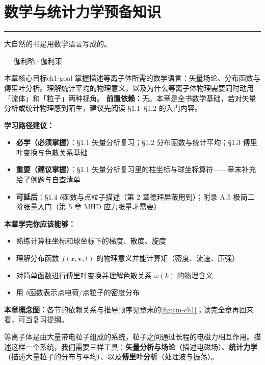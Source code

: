 \documentclass[12pt,a4paper,openany,oneside]{book}
\let\plainepigraph\epigraph
\renewcommand{\epigraph}[2]{%
  \par\addvspace{1.5pt}\noindent\hfill{\color{figAmber!75}\rule{2.8cm}{0.6pt}}\par
  \vspace{0.6pt}\plainepigraph{#1}{#2}}
\newcommand{\vect}[1]{\bm{#1}}
\begin{document}
\newpage


\chapter{数学与统计力学预备知识}\label{ch:1}
\epigraph{大自然的书是用数学语言写成的。}{--- 伽利略·伽利莱}

\begin{insight}{本章核心目标}{ch1-goal}
掌握描述等离子体所需的数学语言：矢量场论、分布函数与傅里叶分析。理解统计平均的物理意义，以及为什么等离子体物理需要同时动用「流体」和「粒子」两种视角。
\tcblower
\textbf{前置依赖：}无。本章是全书数学基础，若对矢量分析或统计物理感到陌生，建议先阅读 \S 1.1--\S 1.2 的入门内容。

\textbf{学习路径建议：}

\begin{itemize}[leftmargin=*]
\item[\textcolor{red}{$\blacksquare$}] \textbf{必学（必须掌握）}：\S 1.1 矢量分析复习；\S 1.2 分布函数与统计平均；\S 1.3 傅里叶变换与色散关系基础
\item[\textcolor{orange}{$\blacksquare$}] \textbf{重要（建议掌握）}：\S 1.1 矢量分析复习里的柱坐标与球坐标算符——章末补充给了例题与自查清单
\item[\textcolor{green}{$\blacksquare$}] \textbf{可延后}：\S 1.4 $\delta$函数与点粒子描述（第 2 章德拜屏蔽用到）；附录 A.5 极简二阶张量入门（第 5 章 MHD 应力张量才需要）
\end{itemize}

\textbf{本章学完你应该能够：}
\begin{itemize}[label=$\square$]
\item 熟练计算柱坐标和球坐标下的梯度、散度、旋度
\item 理解分布函数 $f(\vect{r},\vect{v},t)$ 的物理意义并能计算矩（密度、流速、压强）
\item 对简单函数进行傅里叶变换并理解色散关系 $\omega(k)$ 的物理含义
\item 用 $\delta$函数表示点电荷/点粒子的密度分布
\end{itemize}
\textbf{本章概念图：}各节的依赖关系与推导顺序见章末的\cref{fig:cm-ch1}；读完全章再回来看，可当复习提纲。
\end{insight}

等离子体是由大量带电粒子组成的系统，粒子之间通过长程的电磁力相互作用。描述这样一个系统，我们需要三样工具：\textbf{矢量分析与场论}（描述电磁场）、\textbf{统计力学}（描述大量粒子的分布与平均）、以及\textbf{傅里叶分析}（处理波与振荡）。
\end{document}
